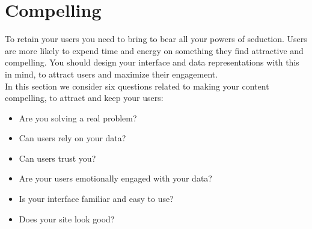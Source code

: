 \section{Compelling}

To retain your users you need to bring to bear all your powers of seduction.
Users are more likely to expend time and energy on something they find attractive and compelling.
You should design your interface and data representations with this in mind, to attract users and maximize their engagement.\\

In this section we consider six questions related to making your content compelling, to attract and keep your users:

\begin{itemize}
    \item Are you solving a real problem?
    \item Can users rely on your data?
    \item Can users trust you?
    \item Are your users emotionally engaged with your data?
    \item Is your interface familiar and easy to use?
    \item Does your site look good?
\end{itemize}






